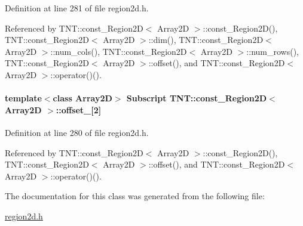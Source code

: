 Definition at line 281 of file region2d.h.



Referenced by TNT::const\_\-Region2D$<$ Array2D $>$::const\_\-Region2D(), TNT::const\_\-Region2D$<$ Array2D $>$::dim(), TNT::const\_\-Region2D$<$ Array2D $>$::num\_\-cols(), TNT::const\_\-Region2D$<$ Array2D $>$::num\_\-rows(), TNT::const\_\-Region2D$<$ Array2D $>$::offset(), and TNT::const\_\-Region2D$<$ Array2D $>$::operator()().

\paragraph[{offset\_\-}]{\setlength{\rightskip}{0pt plus 5cm}template$<$class Array2D$>$ {\bf Subscript} {\bf TNT::const\_\-Region2D}$<$ Array2D $>$::{\bf offset\_\-}\mbox{[}2\mbox{]}}\hfill\label{class_t_n_t_1_1const___region2_d_a45945dd289e38180719724e457b56076}


Definition at line 280 of file region2d.h.



Referenced by TNT::const\_\-Region2D$<$ Array2D $>$::const\_\-Region2D(), TNT::const\_\-Region2D$<$ Array2D $>$::offset(), and TNT::const\_\-Region2D$<$ Array2D $>$::operator()().



The documentation for this class was generated from the following file:\begin{DoxyCompactItemize}
\item 
\hyperlink{region2d_8h}{region2d.h}\end{DoxyCompactItemize}
